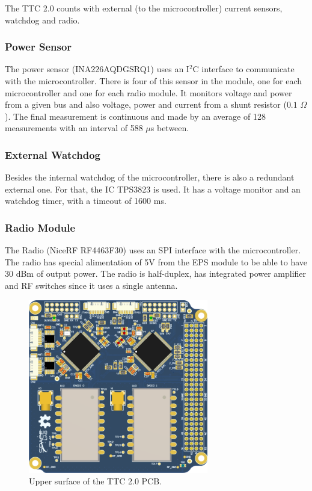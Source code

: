 The TTC 2.0 counts with external (to the microcontroller) current sensors, watchdog and radio.

\subsubsection{Power Sensor}

The power sensor (INA226AQDGSRQ1) uses an I$^{2}$C interface to communicate with the microcontroller. There is four of this sensor in the module, one for each microcontroller and one for each radio module. It monitors voltage and power from a given bus and also voltage, power and current from a shunt resistor ($0.1$ $\Omega$). The final measurement is continuous and made by an average of 128 measurements with an interval of 588 $\mu$s between.

\subsubsection{External Watchdog}

Besides the internal watchdog of the microcontroller, there is also a redundant external one. For that, the IC TPS3823 is used. It has a voltage monitor and an watchdog timer, with a timeout of 1600 ms.

\subsubsection{Radio Module}

The Radio (NiceRF RF4463F30) uses an SPI interface with the microcontroller. The radio has special alimentation of 5V from the EPS module to be able to have 30 dBm of output power. The radio is half-duplex, has integrated power amplifier and RF switches since it uses a single antenna.

\begin{figure}[!ht]
    \begin{center}
        \includegraphics[width=0.7\textwidth]{figures/ttc2_pcb_top.png}
        \caption{Upper surface of the TTC 2.0 PCB.}
        \label{fig:ttc2-pcb-top}
    \end{center}
\end{figure}

